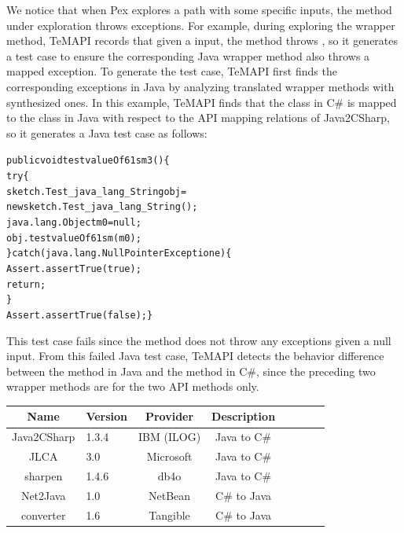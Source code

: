 We notice that when Pex explores a path with some specific inputs, the method under exploration throws exceptions.
For example, during exploring the  wrapper method, TeMAPI records that given a  input, the method throws , so it generates a test case to ensure the corresponding Java wrapper method also throws a mapped exception. To generate the test case, TeMAPI first finds the corresponding exceptions in Java by analyzing translated wrapper methods with synthesized ones. In this example, TeMAPI finds that the  class in C\# is mapped to the  class in Java with respect to the API mapping relations of Java2CSharp, so it generates a Java test case as follows:

\begin{CodeOut}\vspace*{-1ex}
\begin{alltt}
 public void testvalueOf61sm3()\{
   try\{
     sketch.Test_java_lang_String obj =
           new sketch.Test_java_lang_String();
     java.lang.Object m0 = null;
     obj.testvalueOf61sm(m0);
   \}catch(java.lang.NullPointerException e)\{
     Assert.assertTrue(true);
     return;
   \}
   Assert.assertTrue(false); \}
\end{alltt}
\end{CodeOut}\vspace*{-1ex}

This test case fails since the  method does not throw any exceptions given a null input.
From this failed Java test case, TeMAPI detects the behavior difference between the  method in Java and the  method in C\#, since the preceding two wrapper methods are for the two API methods only.
\begin{table}[t]
\centering
\begin{SmallOut}
\begin {tabular} {|c|l|c|c|c|c|c|c|}
 \hline
\textbf{Name}& \textbf{Version}& \textbf{Provider} &\textbf{Description}\\
\hline
Java2CSharp  &  1.3.4 & IBM (ILOG) & Java to C\# \\
\hline
JLCA         &  3.0   & Microsoft  & Java to C\# \\
\hline
sharpen      &  1.4.6 & db4o       & Java to C\# \\
\hline
Net2Java     &  1.0   & NetBean    &  C\# to Java\\
\hline
converter    &  1.6   & Tangible   &  C\# to Java\\
\hline
\end{tabular}\vspace*{-2ex}
 \label{table:subjects}
\end{SmallOut}\vspace*{-2ex}
\end{table}
